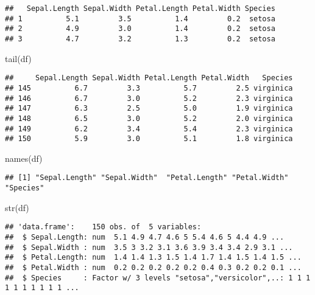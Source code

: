 \documentclass[
]{article}
\newenvironment{Shaded}{\begin{snugshade}}{\end{snugshade}}
\newcommand{\FunctionTok}[1]{\textcolor[rgb]{0.00,0.00,0.00}{#1}}
\newcommand{\NormalTok}[1]{#1}
\begin{document}
\begin{verbatim}
##   Sepal.Length Sepal.Width Petal.Length Petal.Width Species
## 1          5.1         3.5          1.4         0.2  setosa
## 2          4.9         3.0          1.4         0.2  setosa
## 3          4.7         3.2          1.3         0.2  setosa
\end{verbatim}

\begin{Shaded}
\begin{Highlighting}[]
\FunctionTok{tail}\NormalTok{(df)}
\end{Highlighting}
\end{Shaded}

\begin{verbatim}
##     Sepal.Length Sepal.Width Petal.Length Petal.Width   Species
## 145          6.7         3.3          5.7         2.5 virginica
## 146          6.7         3.0          5.2         2.3 virginica
## 147          6.3         2.5          5.0         1.9 virginica
## 148          6.5         3.0          5.2         2.0 virginica
## 149          6.2         3.4          5.4         2.3 virginica
## 150          5.9         3.0          5.1         1.8 virginica
\end{verbatim}

\begin{Shaded}
\begin{Highlighting}[]
\FunctionTok{names}\NormalTok{(df)}
\end{Highlighting}
\end{Shaded}

\begin{verbatim}
## [1] "Sepal.Length" "Sepal.Width"  "Petal.Length" "Petal.Width"  "Species"
\end{verbatim}

\begin{Shaded}
\begin{Highlighting}[]
\FunctionTok{str}\NormalTok{(df)}
\end{Highlighting}
\end{Shaded}

\begin{verbatim}
## 'data.frame':    150 obs. of  5 variables:
##  $ Sepal.Length: num  5.1 4.9 4.7 4.6 5 5.4 4.6 5 4.4 4.9 ...
##  $ Sepal.Width : num  3.5 3 3.2 3.1 3.6 3.9 3.4 3.4 2.9 3.1 ...
##  $ Petal.Length: num  1.4 1.4 1.3 1.5 1.4 1.7 1.4 1.5 1.4 1.5 ...
##  $ Petal.Width : num  0.2 0.2 0.2 0.2 0.2 0.4 0.3 0.2 0.2 0.1 ...
##  $ Species     : Factor w/ 3 levels "setosa","versicolor",..: 1 1 1 1 1 1 1 1 1 1 ...
\end{verbatim}
\end{document}
